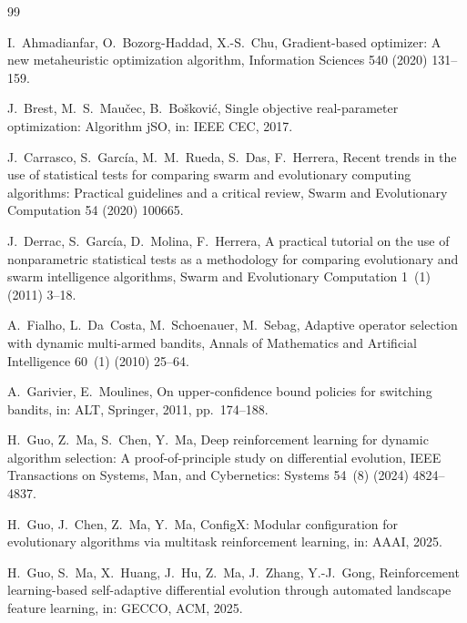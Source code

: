 \documentclass[preprint,12pt,number]{elsarticle}
\begin{document}



\begin{thebibliography}{99}

I.~Ahmadianfar, O.~Bozorg-Haddad, X.-S.~Chu, Gradient-based optimizer: A new metaheuristic optimization algorithm, Information Sciences 540 (2020) 131--159.

J.~Brest, M.~S.~Mau\v{c}ec, B.~Bo\v{s}kovi\'c, Single objective real-parameter optimization: Algorithm jSO, in: IEEE CEC, 2017.

J.~Carrasco, S.~Garc\'ia, M.~M.~Rueda, S.~Das, F.~Herrera, Recent trends in the use of statistical tests for comparing swarm and evolutionary computing algorithms: Practical guidelines and a critical review, Swarm and Evolutionary Computation 54 (2020) 100665.

J.~Derrac, S.~Garc\'ia, D.~Molina, F.~Herrera, A practical tutorial on the use of nonparametric statistical tests as a methodology for comparing evolutionary and swarm intelligence algorithms, Swarm and Evolutionary Computation 1~(1) (2011) 3--18.

A.~Fialho, L.~Da~Costa, M.~Schoenauer, M.~Sebag, Adaptive operator selection with dynamic multi-armed bandits, Annals of Mathematics and Artificial Intelligence 60~(1) (2010) 25--64.

A.~Garivier, E.~Moulines, On upper-confidence bound policies for switching bandits, in: ALT, Springer, 2011, pp.~174--188.

H.~Guo, Z.~Ma, S.~Chen, Y.~Ma, Deep reinforcement learning for dynamic algorithm selection: A proof-of-principle study on differential evolution, IEEE Transactions on Systems, Man, and Cybernetics: Systems 54~(8) (2024) 4824--4837.

H.~Guo, J.~Chen, Z.~Ma, Y.~Ma, ConfigX: Modular configuration for evolutionary algorithms via multitask reinforcement learning, in: AAAI, 2025.

H.~Guo, S.~Ma, X.~Huang, J.~Hu, Z.~Ma, J.~Zhang, Y.-J.~Gong, Reinforcement learning-based self-adaptive differential evolution through automated landscape feature learning, in: GECCO, ACM, 2025.


\end{thebibliography}
\end{document}
